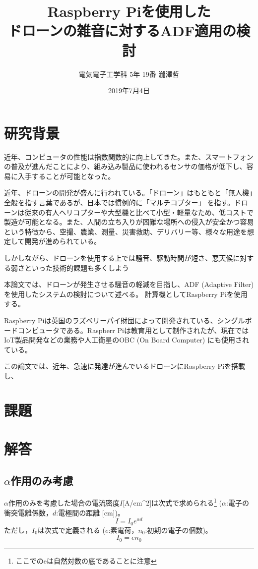 \documentclass[a4paper, twocolumn]{ltjsarticle}
\title{Raspberry Piを使用した\\ドローンの雑音に対するADF適用の検討}
\author{電気電子工学科 5年 19番 瀧澤哲}
\date{2019年7月4日}
\begin{document}
%

\maketitle
  
\section{研究背景}
  近年、コンピュータの性能は指数関数的に向上してきた。また、スマートフォンの普及が進んだことにより、組み込み製品に使われるセンサの価格が低下し、容易に入手することが可能となった。

  近年、ドローンの開発が盛んに行われている。「ドローン」はもともと「無人機」全般を指す言葉であるが、日本では慣例的に「マルチコプター」を指す。ドローンは従来の有人ヘリコプターや大型機と比べて小型・軽量なため、低コストで製造が可能となる。また、人間の立ち入りが困難な場所への侵入が安全かつ容易という特徴から、空撮、農業、測量、災害救助、デリバリー等、様々な用途を想定して開発が進められている。

  しかしながら、ドローンを使用する上では騒音、駆動時間が短さ、悪天候に対する弱さといった技術的課題も多くしよう

  本論文では、ドローンが発生させる騒音の軽減を目指し、ADF (Adaptive Filter) を使用したシステムの検討について述べる。
  計算機としてRaspberry Piを使用する。


  Raspberry Piは英国のラズベリーパイ財団によって開発されている、シングルボードコンピュータである。Raspberr Piは教育用として制作されたが、現在ではIoT製品開発などの業務や人工衛星のOBC (On Board Computer) にも使用されている。
  
  この論文では、近年、急速に発達が進んでいるドローンにRaspberry Piを搭載し、

\section*{課題}


\section*{解答}
  \subsection*{\(\alpha\)作用のみ考慮}
    \(\alpha\)作用のみを考慮した場合の電流密度\(I\)[A/cm^2]は次式で求められる\footnote{ここでのeは自然対数の底であることに注意} (\(\alpha\):電子の衝突電離係数，\(d\):電極間の距離 [cm])｡
    \begin{equation}
      I = I_0 e^{\alpha d} 
      \label{equation:alpha_I}
    \end{equation}
    ただし，\(I_0\)は次式で定義される (\(e\):素電荷，\(n_0\):初期の電子の個数)｡
    \begin{equation}
      I_0 = e n_0
      \label{equation:I_0}
    \end{equation}
\end{document}
